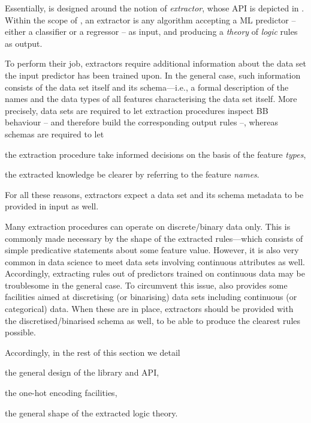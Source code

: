 \documentclass[12pt,a4paper,openright,twoside]{book}
\begin{document}
Essentially, \psyke{} is designed around the notion of \emph{extractor}, whose API is depicted in .
%
Within the scope of \psyke{}, an extractor is any algorithm accepting a ML predictor -- either a classifier or a regressor -- as input, and producing a \emph{theory} of \emph{logic} rules as output.

To perform their job, \psyke{} extractors require additional information about the data set the input predictor has been trained upon.
%
In the general case, such information consists of the data set itself and its schema---i.e., a formal description of the names and the data types of all features characterising the data set itself.
%
More precisely, data sets are required to let extraction procedures inspect BB behaviour -- and therefore build the corresponding output rules --, whereas schemas are required to let
%
\begin{inlinelist}
    \item the extraction procedure take informed decisions on the basis of the feature \emph{types},
    \item the extracted knowledge be clearer by referring to the feature \emph{names}.
\end{inlinelist}
%
For all these reasons, extractors expect a data set and its schema metadata to be provided in input as well.

Many extraction procedures can operate on discrete/binary data only.
%
This is commonly made necessary by the shape of the extracted rules---which consists of simple predicative statements about some feature value.
%
However, it is also very common in data science to meet data sets involving continuous attributes as well.
%
Accordingly, extracting rules out of predictors trained on continuous data may be troublesome in the general case.
%
To circumvent this issue, \psyke{} also provides some facilities aimed at discretising (or binarising) data sets including continuous (or categorical) data.
%
When these are in place, extractors should be provided with the discretised/binarised schema as well, to be able to produce the clearest rules possible.

Accordingly, in the rest of this section we detail
%
\begin{inlinelist}
    \item the general design of the \psyke{} library and API,
    \item the one-hot encoding facilities,
    \item the general shape of the extracted logic theory.
\end{inlinelist}
\end{document}
